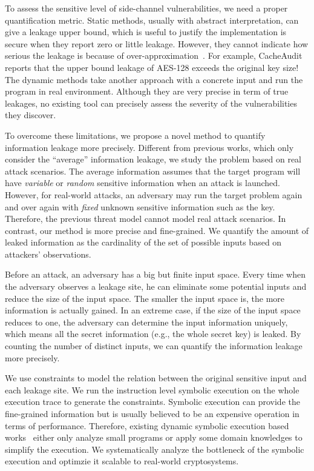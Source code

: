 To assess the sensitive level of side-channel vulnerabilities, we need a proper 
quantification metric.
Static methods, usually with abstract interpretation, can give a leakage upper bound, 
which is useful to justify the implementation is secure when they report zero or little leakage. 
However, they cannot indicate how serious the leakage is because of over-approximation~\cite{xxx}. 
For example, CacheAudit~\cite{xxx} reports that the upper bound leakage of AES-128 exceeds 
the original key size! The dynamic methods take another approach with a concrete input and 
run the program in real environment. Although they are very precise in term of true leakages, 
no existing tool can precisely assess the severity of the vulnerabilities they discover.

To overcome these limitations, we propose a novel method
to quantify information leakage more precisely. 
Different from previous works, which only consider the
``average'' information leakage, we study the problem based on real attack scenarios.
The average information assumes that the target program will have \emph{variable}
or \emph{random} sensitive 
information when an attack is launched.
However, for real-world attacks, an adversary may run the target problem again and over again 
with \emph{fixed} unknown sensitive information such as the key. 
Therefore, the previous threat model cannot model real attack scenarios.
In contrast, our method is more precise and fine-grained. 
We quantify the amount of leaked information as the cardinality of the set of 
possible inputs based on attackers' observations. 

Before an attack, an adversary has a big but finite input space.
Every time when the adversary observes a leakage site, he can eliminate some 
potential inputs and reduce the size of the input space. 
The smaller the input space is, the more information is actually gained. 
In an extreme case, if the size of the input space reduces to one, 
the adversary can determine the input information uniquely, which means all the secret information
(e.g., the whole secret key) is leaked. By counting the number of distinct inputs, 
we can quantify the information leakage more precisely. 

We use constraints to model the relation between the original sensitive input and
each leakage site. We run the instruction level symbolic execution on the whole
execution trace to generate the constraints. Symbolic execution can provide the fine-grained
information but is usually believed to be an expensive operation in terms of performance. 
Therefore, existing dynamic symbolic execution based works~\cite{xxx} either only analyze 
small programs or apply some domain knowledges to simplify the execution. We systematically
analyze the bottleneck of the symbolic execution and optimzie it scalable to
real-world cryptosystems. 

